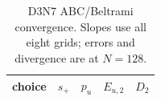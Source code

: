 \begin{table}[htbp]

\centering
\footnotesize
\setlength{\tabcolsep}{4.2pt}
\caption{D3N7 ABC/Beltrami convergence.  Slopes use all eight grids; errors
and divergence are at $N=128$.}
\label{tab:numerical-beltrami-convergence}
\begin{tabular}{@{}lrrrr@{}}
\toprule
choice & $s_{+}$ & $p_u$ & $E_{u,2}$ & $D_2$\\
\midrule
\bottomrule
\end{tabular}
\end{table}
